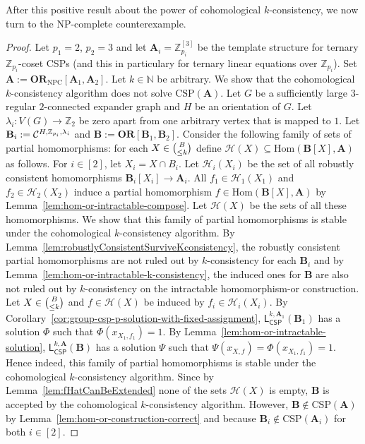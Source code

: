 \documentclass[a4paper,english, thm-restate]{lipics-v2021}
\newcommand{\nat}{\mathbb{N}}
\newcommand{\ZZ}{\mathbb{Z}}
\newcommand{\StructA}{\mathbf{A}}
\newcommand{\StructB}{\mathbf{B}}
\newcommand{\CSP}[1]{\mathrm{CSP}(#1)}
\newcommand{\Hom}[2]{\mathrm{Hom}(#1,#2)}
\newcommand{\leqs}{\mathsf{L}}
\newcommand{\cspiso}[3]{\leqs^{#1,#2}_{\mathsf{CSP}}(#3)}
\newcommand{\Hh}{\mathcal{H}}
\newcommand{\CosetGrpTmplt}[2]{#1^{[#2]}}
\newcommand{\ORNPC}[1]{\mathbf{OR}_\text{NPC}[#1]}
\newcommand{\OR}[1]{\mathbf{OR}[#1]}
\begin{document}
	After this positive result about the power of cohomological $k$-consistency, we now turn to the NP-complete counterexample.
	
	\cohomologyDoesNotSolveAllCSP*
	\begin{proof}
		Let $p_1=2$, $p_2=3$ and let $\StructA_i =\CosetGrpTmplt{\ZZ_{p_i}}{3}$ be the template structure
		for ternary $\ZZ_{p_i}$-coset CSPs (and this in particulary for ternary linear equations over $\ZZ_{p_i}$).
		Set $\StructA := \ORNPC{\StructA_1,\StructA_2}$.
		Let $k\in\nat$ be arbitrary.
		We show that the cohomological $k$-consistency algorithm does not solve $\CSP{\StructA}$.
		Let $G$ be a sufficiently large $3$-regular $2$-connected expander graph and $H$ be an orientation of $G$.
		Let $\lambda_i \colon V(G) \to \ZZ_2$ be zero apart from one arbitrary vertex that is mapped to $1$.
		Let $\StructB_i := \grpCSP{H}{\ZZ_{p_i}}{\lambda_i}$
		and $\StructB := \OR{\StructB_1,\StructB_2}$.
		Consider the following family of sets of partial homomorphisms:
		for each $X \in \tbinom{B}{\leq k}$ define $\Hh(X) \subseteq \Hom{\StructB[X]}{\StructA}$ as follows.
		For $i\in[2]$, let $X_i = X \cap B_i$.
		Let $\Hh_i(X_i)$ be the set of all robustly consistent homomorphisms $\StructB_i[X_i] \to \StructA_i$.
		All $f_1 \in \Hh_1(X_1)$ and $f_2 \in \Hh_2(X_2)$
		induce a partial homomorphism $f \in \Hom{\StructB[X]}{\StructA}$
		by Lemma~\ref{lem:hom-or-intractable-compose}.
		Let $\Hh(X)$ be the sets of all these homomorphisms.
		We show that this family of partial homomorphisms is stable
		under the cohomological $k$-consistency algorithm.
		By Lemma~\ref{lem:robustlyConsistentSurviveKconsistency},
		the robustly consistent partial homomorphisms are not ruled out by $k$-consistency for each $\StructB_i$
		and by Lemma~\ref{lem:hom-or-intractable-k-consistency},
		the induced ones for $\StructB$ are also not ruled out by $k$-consistency
		on the intractable homomorphism-or construction.
		Let $X \in \tbinom{B}{\leq k}$
		and $f \in \Hh(X)$ be induced by $f_i \in \Hh_i(X_i)$.
		By Corollary~\ref{cor:group-csp-p-solution-with-fixed-assignment},
		$\cspiso{k}{\StructA_1}{\StructB_1}$ has a solution $\Phi$
		such that $\Phi(x_{X_1,f_1}) = 1$.
		By Lemma~\ref{lem:hom-or-intractable-solution},
		$\cspiso{k}{\StructA}{\StructB}$ has a solution $\Psi$
		such that $\Psi(x_{X,f}) = \Phi(x_{X_1,f_1}) = 1$.
		Hence indeed, this family of partial homomorphisms is stable under the cohomological $k$-consistency algorithm.
		Since by Lemma~\ref{lem:fHatCanBeExtended}
		none of the sets $\Hh(X)$ is empty,
		$\StructB$ is accepted by the cohomological $k$-consistency algorithm.
		However, $\StructB \notin \CSP{\StructA}$ by Lemma~\ref{lem:hom-or-construction-correct} and
		because $\StructB_i \notin \CSP{\StructA_i}$ for both $i\in[2]$.
		

\end{proof}
\end{document}
